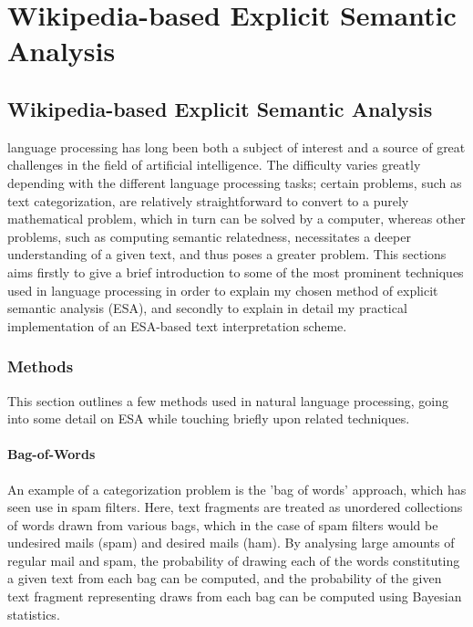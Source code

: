 \part{Wikipedia-based Explicit Semantic Analysis}
\label{part:ESA}
\chapter[ESA]{Wikipedia-based Explicit Semantic Analysis}
 language processing has long been both a subject of interest and a source of great challenges in the field of artificial intelligence. The difficulty varies greatly depending with the different language processing tasks; certain problems, such as text categorization, are relatively straightforward to convert to a purely mathematical problem, which in turn can be solved by a computer, whereas other problems, such as computing semantic relatedness, necessitates a deeper understanding of a given text, and thus poses a greater problem. This sections aims firstly to give a brief introduction to some of the most prominent techniques used in language processing in order to explain my chosen method of explicit semantic analysis (ESA), and secondly to explain in detail my practical implementation of an ESA-based text interpretation scheme.

\section{Methods}
This section outlines a few methods used in natural language processing, going into some detail on ESA while touching briefly upon related techniques.

\subsection{Bag-of-Words}
An example of a categorization problem is the 'bag of words' approach, which has seen use in spam filters. Here, text fragments are treated as unordered collections of words drawn from various bags, which in the case of spam filters would be undesired mails (spam) and desired mails (ham). By analysing large amounts of regular mail and spam, the probability of drawing each of the words constituting a given text from each bag can be computed, and the probability of the given text fragment representing draws from each bag can be computed using Bayesian statistics.

